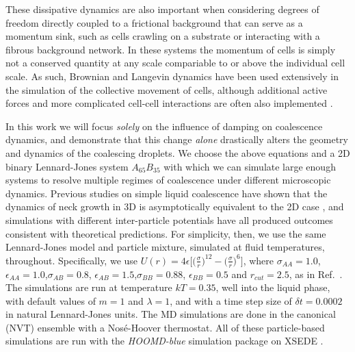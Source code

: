 \documentclass[%
reprint,
amsmath,amssymb,
aps,
]{revtex4-2}
\begin{document}
 These dissipative dynamics are also important when considering degrees of freedom directly coupled to a frictional background that can serve as a momentum sink, such as cells crawling on a substrate or interacting with a fibrous background network. In these systems the momentum of cells is simply not a conserved quantity at any scale compariable to or above the individual cell scale. As such, Brownian and Langevin dynamics have been used extensively in the simulation of the collective movement of cells, although additional active forces and more complicated cell-cell interactions are often also implemented \cite{camley2017physical}.
	
In this work we will focus \emph{solely} on the influence of damping on coalescence dynamics, and demonstrate that this change \emph{alone} drastically alters the geometry and dynamics of the coalescing droplets. We choose the above equations and a 2D binary Lennard-Jones system $A_{65}B_{35}$ with which we can simulate large enough systems to resolve multiple regimes of coalescence under different microscopic dynamics. Previous studies on simple liquid coalescence have shown that the dynamics of neck growth in 3D is asymptotically equivalent to the 2D case \cite{eggersCoalescenceLiquidDrops1999a}, and simulations with different inter-particle potentials \cite{pothier2012molecular,heinenDropletCoalescenceMolecular2022a} have all produced outcomes consistent with theoretical predictions. For simplicity, then, we use the same Lennard-Jones model and particle mixture, simulated at fluid temperatures, throughout. Specifically, we use $U(r) = 4\epsilon\big[\big(\frac{\sigma}{r}\big)^{12}-\big(\frac{\sigma}{r}\big)^6\big]$, where $\sigma_{AA} = 1.0$, $\epsilon_{AA} = 1.0$,$\sigma_{AB} = 0.8$, $\epsilon_{AB} = 1.5$,$\sigma_{BB} = 0.88$, $\epsilon_{BB} = 0.5$ and $r_{cut}=2.5$, as in Ref.~\cite{bruningGlassTransitionsOne2008}. The simulations are run at temperature $kT=0.35$, well into the liquid phase, with default values of $m=1$ and $\lambda=1$, and with a time step size of $\delta t = 0.0002$ in natural Lennard-Jones units.  The MD simulations are done in the canonical (NVT) ensemble with a Nos\'{e}-Hoover thermostat. All of these particle-based  simulations are run with the \textit{HOOMD-blue} \cite{andersonHOOMDbluePythonPackage2020} simulation package on XSEDE \cite{towns2014xsede}. 
	
\end{document}
